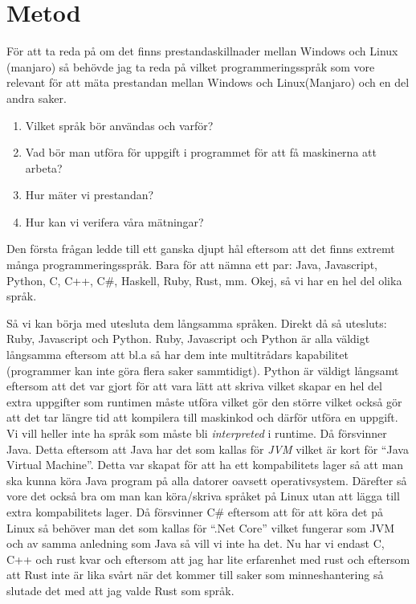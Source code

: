 \documentclass[12pt, a4paper]{report}
\begin{document}
 
\section{Metod}
 
För att ta reda på om det finns prestandaskillnader mellan Windows och Linux (manjaro) så behövde jag ta reda på vilket programmeringsspråk som vore relevant för att mäta prestandan mellan Windows och Linux(Manjaro) och en del andra saker.
 
\begin{enumerate}
   \item Vilket språk bör användas och varför?
   \item Vad bör man utföra för uppgift i programmet för att få maskinerna att arbeta?
   \item Hur mäter vi prestandan?
   \item Hur kan vi verifera våra mätningar?
\end{enumerate}
 
Den första frågan ledde till ett ganska djupt hål eftersom att det finns extremt många programmeringsspråk. Bara för att nämna ett par: Java, Javascript, Python, C, C++, C\#, Haskell, Ruby, Rust, mm. Okej, så vi har en hel del olika språk.
 
Så vi kan börja med utesluta dem långsamma språken. Direkt då så utesluts: Ruby, Javascript och Python. Ruby, Javascript och Python är alla väldigt långsamma eftersom att bl.a så har dem inte multitrådars kapabilitet (programmer kan inte göra flera saker sammtidigt). Python är väldigt långsamt eftersom att det var gjort för att vara lätt att skriva vilket skapar en hel del extra uppgifter som runtimen måste utföra vilket gör den större vilket också gör att det tar längre tid att kompilera till maskinkod och därför utföra en uppgift. Vi vill heller inte ha språk som måste bli \textit{interpreted} i runtime. Då försvinner Java. Detta eftersom att Java har det som kallas för \textit{JVM} vilket är kort för ``Java Virtual Machine''. Detta var skapat för att ha ett kompabilitets lager så att man ska kunna köra Java program på alla datorer oavsett operativsystem. Därefter så vore det också bra om man kan köra/skriva språket på Linux utan att lägga till extra kompabilitets lager. Då försvinner C\# eftersom att för att köra det på Linux så behöver man det som kallas för ``.Net Core'' vilket fungerar som JVM och av samma anledning som Java så vill vi inte ha det. Nu har vi endast C, C++ och rust kvar och eftersom att jag har lite erfarenhet med rust och eftersom att Rust inte är lika svårt när det kommer till saker som minneshantering så slutade det med att jag valde Rust som språk.
 
\end{document}
